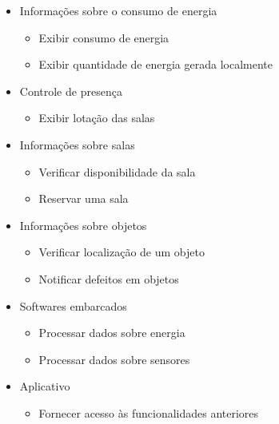 \begin{apendicesenv}
  \begin{itemize}
    \item Informações sobre o consumo de energia
      \begin{itemize}
        \item Exibir consumo de energia
        \item Exibir quantidade de energia gerada localmente
      \end{itemize}
    \item Controle de presença
      \begin{itemize}
        \item Exibir lotação das salas
      \end{itemize}
    \item Informações sobre salas
      \begin{itemize}
        \item Verificar disponibilidade da sala
        \item Reservar uma sala
      \end{itemize}
    \item Informações sobre objetos
      \begin{itemize}
        \item Verificar localização de um objeto
        \item Notificar defeitos em objetos
      \end{itemize}
    \item Softwares embarcados
      \begin{itemize}
        \item Processar dados sobre energia
        \item Processar dados sobre sensores
      \end{itemize}
    \item Aplicativo
      \begin{itemize}
        \item Fornecer acesso às funcionalidades anteriores
      \end{itemize}
  \end{itemize}


\end{apendicesenv}
